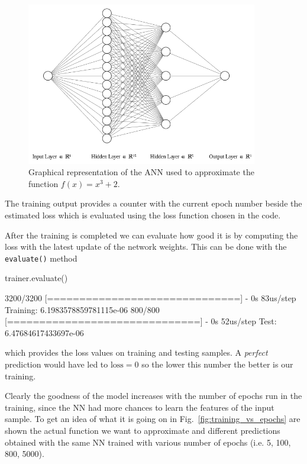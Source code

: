 \begin{figure}[htb]
	\centering
	\includegraphics[width=0.9\textwidth]{figures/ann_1.png}
	\caption{Graphical representation of the ANN used to approximate the function $f(x) = x^3 + 2$.}
    \label{fig:ann_1}
\end{figure}

The training output provides a counter with the current epoch number beside the estimated loss
which is evaluated using the loss function chosen in the code.

After the training is completed we can evaluate how good it is by computing the loss with the 
latest update of the network weights. This can be done with the \texttt{evaluate()} method

\begin{ipython}
trainer.evaluate()
\end{ipython}
\begin{ioutput}
3200/3200 [==============================] - 0s 83us/step
Training: 6.1983578859781115e-06
800/800 [==============================] - 0s 52us/step
Test: 6.47684617433697e-06
\end{ioutput}
\noindent
which provides the loss values on training and testing samples.
A \emph{perfect} prediction would have led to \(\textrm{loss}=0\) so the
lower this number the better is our training. 

Clearly the goodness of the model increases with the number of epochs run in the training,
since the NN had more chances to learn the features of the input sample. 
To get an idea of what it is going on in Fig.~\ref{fig:training_vs_epochs} are shown the
actual function we want to approximate and different predictions obtained with the same
NN trained with various number of epochs (i.e. 5, 100, 800, 5000).

